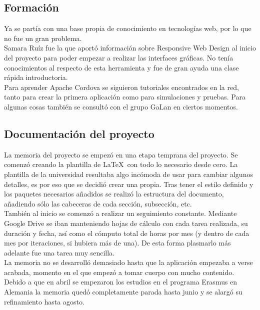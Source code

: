 \subsection{Formación}

Ya se partía con una base propia de conocimiento en tecnologías web, por lo que no fue un gran problema.\\

Samara Ruíz fue la que aportó información sobre Responsive Web Design al inicio del proyecto para poder empezar a realizar las interfaces gráficas. No tenía conocimientos al respecto de esta herramienta y fue de gran ayuda una clase rápida introductoria.\\

Para aprender Apache Cordova se siguieron tutoriales encontrados en la red, tanto para crear la primera aplicación como para simulaciones y pruebas. Para algunas cosas también se consultó con el grupo GaLan en ciertos momentos.\\

\subsection{Documentación del proyecto}

La memoria del proyecto se empezó en una etapa temprana del proyecto. Se comenzó creando la plantilla de \LaTeX \ con todo lo necesario desde cero. La plantilla de la universidad resultaba algo incómoda de usar para cambiar algunos detalles, es por eso que se decidió crear una propia. Tras tener el estilo definido y los paquetes necesarios añadidos se realizó la estructura del documento, añadiendo sólo las cabeceras de cada sección, subsección, etc.\\

También al inicio se comenzó a realizar un seguimiento constante. Mediante Google Drive se iban manteniendo hojas de cálculo con cada tarea realizada, su duración y fecha, así como el cómputo total de horas por mes (y dentro de cada mes por iteraciones, si hubiera más de una). De esta forma plasmarlo más adelante fue una tarea muy sencilla.\\

La memoria no se desarrolló demasiado hasta que la aplicación empezaba a verse acabada, momento en el que empezó a tomar cuerpo con mucho contenido. Debido a que en abril se empezaron los estudios en el programa Erasmus en Alemania la memoria quedó completamente parada hasta junio y se alargó su refinamiento hasta agosto.\\

